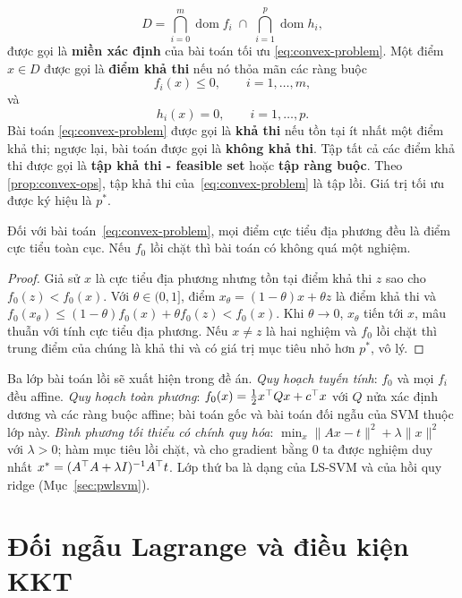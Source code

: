 $$
D
=
\bigcap_{i=0}^{m}\operatorname{dom} f_i
\;\cap\;
\bigcap_{i=1}^{p}\operatorname{dom} h_i,
$$
được gọi là \textbf{miền xác định} của bài toán tối ưu \cref{eq:convex-problem}. Một điểm \(x\in D\) được gọi là \textbf{điểm khả thi} nếu nó thỏa mãn các ràng buộc
$$
f_i(x)\leq0,\qquad i=1,\ldots,m,
$$
và
$$
h_i(x)=0,\qquad i=1,\ldots,p.
$$
Bài toán \cref{eq:convex-problem} được gọi là \textbf{khả thi} nếu tồn tại ít nhất một điểm khả thi; ngược lại, bài toán được gọi là \textbf{không khả thi}. Tập tất cả các điểm khả thi được gọi là \textbf{tập khả thi - feasible set} hoặc \textbf{tập ràng buộc}.
Theo \cref{prop:convex-ops}, tập khả thi của~\eqref{eq:convex-problem} là tập lồi. Giá trị tối ưu được ký hiệu là $p^\ast$.

\begin{theorem}\label{thm:local-global}
Đối với bài toán~\eqref{eq:convex-problem}, mọi điểm cực tiểu địa phương đều là điểm cực tiểu toàn cục. Nếu $f_0$ lồi chặt thì bài toán có không quá một nghiệm.
\end{theorem}

\begin{proof}
Giả sử $x$ là cực tiểu địa phương nhưng tồn tại điểm khả thi $z$ sao cho $f_0(z)<f_0(x)$. Với $\theta\in(0,1]$, điểm $x_\theta=(1-\theta)x+\theta z$ là điểm khả thi và $f_0(x_\theta)\le(1-\theta)f_0(x)+\theta f_0(z)<f_0(x)$. Khi $\theta\to0$, $x_\theta$ tiến tới $x$, mâu thuẫn với tính cực tiểu địa phương. Nếu $x\neq z$ là hai nghiệm và $f_0$ lồi chặt thì trung điểm của chúng là khả thi và có giá trị mục tiêu nhỏ hơn $p^\ast$, vô lý.
\end{proof}

Ba lớp bài toán lồi sẽ xuất hiện trong đề án. \emph{Quy hoạch tuyến tính}: $f_0$ và mọi $f_i$ đều affine. \emph{Quy hoạch toàn phương}: $f_0(x)=\frac12x^\top Qx+c^\top x$ với $Q$ nửa xác định dương và các ràng buộc affine; bài toán gốc và bài toán đối ngẫu của SVM thuộc lớp này. \emph{Bình phương tối thiểu có chính quy hóa}: $\min_x\|Ax-t\|^2+\lambda\|x\|^2$ với $\lambda>0$; hàm mục tiêu lồi chặt, và cho gradient bằng $0$ ta được nghiệm duy nhất $x^\ast=(A^\top A+\lambda I)^{-1}A^\top t$. Lớp thứ ba là dạng của LS-SVM và của hồi quy ridge (Mục~\ref{sec:pwlsvm}).

\section{Đối ngẫu Lagrange và điều kiện KKT}\label{sec:duality}

